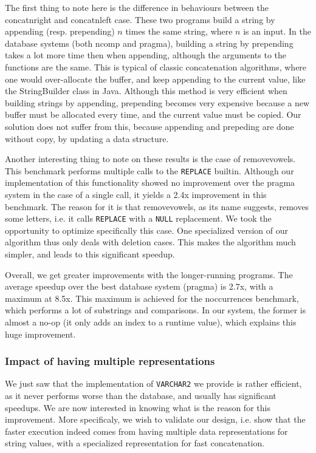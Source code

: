 \documentclass[twoside,11pt,a4paper]{article}
\newcommand{\java}[1]{\textsf{#1}}
\newcommand{\pls}[1]{\small\texttt{#1}\normalsize}
\newcommand{\plstype}[1]{\pls{#1}}
\newcommand{\varchar}{\plstype{VARCHAR2}}
\newcommand{\plsnull}{\pls{NULL}}
\newcommand{\benchsystem}[1]{\textsf{#1}}
\newcommand{\ncomp}{\benchsystem{ncomp}}
\newcommand{\ncpg}{\benchsystem{pragma}}
\newcommand{\bench}[1]{\textsf{#1}}
\begin{document}
The first thing to note here is the difference in behaviours between the \bench{concatnright} and \bench{concatnleft} case. These two programs build a string by appending (resp. prepending) $n$ times the same string, where $n$ is an input. In the database systems (both \ncomp{} and \ncpg{}), building a string by prepending takes a lot more time then when appending, although the arguments to the functions are the same. This is typical of classic concatenation algorithms, where one would over-allocate the buffer, and keep appending to the current value, like the \java{StringBuilder} class in Java. Although this method is very efficient when building strings by appending, prepending becomes very expensive because a new buffer must be allocated every time, and the current value must be copied. Our solution does not suffer from this, because appending and prepeding are done without copy, by updating a data structure.

Another interesting thing to note on these results is the case of \bench{removevowels}. This benchmark performs multiple calls to the \pls{REPLACE} builtin. Although our implementation of this functionality showed no improvement over the \ncpg{} system in the case of a single call, it yields a 2.4x improvement in this benchmark. The reason for it is that \bench{removevowels}, as its name suggests, removes some letters, i.e. it calls \pls{REPLACE} with a \plsnull{} replacement. We took the opportunity to optimize specifically this case. One specialized version of our algorithm thus only deals with deletion cases. This makes the algorithm much simpler, and leads to this significant speedup.

Overall, we get greater improvements with the longer-running programs. The average speedup over the best database system (\ncpg{}) is 2.7x, with a maximum at 8.5x. This maximum is achieved for the \bench{noccurrences} benchmark, which performs a lot of substrings and comparisons. In our system, the former is almost a no-op (it only adds an index to a runtime value), which explains this huge improvement.

\subsubsection{Impact of having multiple representations}

We just saw that the implementation of \varchar{} we provide is rather efficient, as it never performs worse than the database, and usually has significant speedups. We are now interested in knowing what is the reason for this improvement. More specificaly, we wish to validate our design, i.e. show that the faster execution indeed comes from having multiple data representations for string values, with a specialized representation for fast concatenation.
\end{document}
